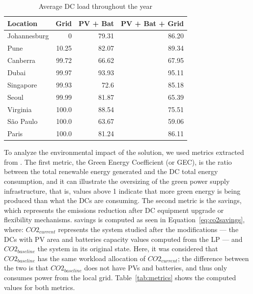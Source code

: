 \begin{table}[!ht]
  
  \caption{Average DC load throughout the year }\label{tab:dcutilization} \centering

  \begin{tabular}{|l|r|r|r|}
   \hline
    
  \textbf{Location} &   \textbf{Grid} & \textbf{PV + Bat} & \textbf{PV + Bat + Grid}  \\
  \hline
  Johannesburg & 0 & 79.31  & 86.20  \\
  \hline
  Pune  & 10.25 &  82.07 & 89.34   \\
  \hline
  Canberra  & 99.72 & 66.62 & 67.95 \\
  \hline
  Dubai   & 99.97 & 93.93 & 95.11   \\
  \hline
  Singapore & 99.93 & 72.6  & 85.18 \\
  \hline     
  Seoul    & 99.99 & 81.87 & 65.39      \\
  \hline
  Virginia   & 100.0 & 88.54 & 75.51 \\
  \hline
  São Paulo   & 100.0 & 63.67 & 59.06 \\
  \hline 
  Paris    & 100.0 & 81.24  &  86.11    \\
  \hline  

\end{tabular}  
\end{table}


To analyze the environmental impact of the solution, we used metrics extracted from \cite{reddy2017_metrics}. The first metric, the Green Energy Coefficient (or GEC), is the ratio between the total renewable energy generated and the DC total energy consumption, and it can illustrate the oversizing of the green power supply infrastructure, that is, values above 1 indicate that more green energy is being produced than what the DCs are consuming. The second metric is the  savings, which represents the emissions reduction after DC equipment upgrade or flexibility mechanisms.  savings is computed as seen in Equation~\ref{eq:co2savings}, where: $CO2_{current}$ represents the system studied after the modifications ---  the DCs with PV area and batteries capacity values computed from the LP  --- and $CO2_{baseline}$ the system in its original state. Here, it was considered that $CO2_{baseline}$ has the same workload allocation of  $CO2_{current}$; the difference between the two is that  $CO2_{baseline}$ does not have PVs and batteries, and thus only consumes power from the local grid. Table~\ref{tab:metrics} shows the computed values for both metrics. 


